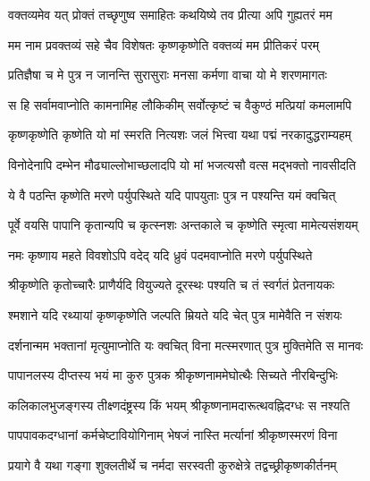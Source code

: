 

\addtocounter{shlokacount}{31}


\twolineshloka
{वक्तव्यमेव यत् प्रोक्तं तच्छृणुष्व समाहितः}
{कथयिष्ये तव प्रीत्या अपि गुह्यतरं मम} %

\twolineshloka
{मम नाम प्रवक्तव्यं सहे चैव विशेषतः}
{कृष्णकृष्णेति वक्तव्यं मम प्रीतिकरं परम्} %

\twolineshloka
{प्रतिज्ञैषा च मे पुत्र न जानन्ति सुरासुराः}
{मनसा कर्मणा वाचा यो मे शरणमागतः} %

\twolineshloka
{स हि सर्वामवाप्नोति कामनामिह लौकिकीम्}
{सर्वोत्कृष्टं च वैकुण्ठं मत्प्रियां कमलामपि} %

\twolineshloka
{कृष्णकृष्णेति कृष्णेति यो मां स्मरति नित्यशः}
{जलं भित्त्वा यथा पद्मं नरकादुद्धराम्यहम्} %

\twolineshloka
{विनोदेनापि दम्भेन मौढ्याल्लोभाच्छलादपि}
{यो मां भजत्यसौ वत्स मद्भक्तो नावसीदति} %

\twolineshloka
{ये वै पठन्ति कृष्णेति मरणे पर्युपस्थिते}
{यदि पापयुताः पुत्र न पश्यन्ति यमं क्वचित्} %

\twolineshloka
{पूर्वे वयसि पापानि कृतान्यपि च कृत्स्नशः}
{अन्तकाले च कृष्णेति स्मृत्वा मामेत्यसंशयम्} %

\twolineshloka
{नमः कृष्णाय महते विवशोऽपि वदेद् यदि}
{ध्रुवं पदमवाप्नोति मरणे पर्युपस्थिते} %

\twolineshloka
{श्रीकृष्णेति कृतोच्चारैः प्राणैर्यदि वियुज्यते}
{दूरस्थः पश्यति च तं स्वर्गतं प्रेतनायकः} %

\twolineshloka
{श्मशाने यदि रथ्यायां कृष्णकृष्णेति जल्पति}
{म्रियते यदि चेत् पुत्र मामेवैति न संशयः} %

\twolineshloka
{दर्शनान्मम भक्तानां मृत्युमाप्नोति यः क्वचित्}
{विना मत्स्मरणात् पुत्र मुक्तिमेति स मानवः} %

\twolineshloka
{पापानलस्य दीप्तस्य भयं मा कुरु पुत्रक}
{श्रीकृष्णनाममेघोत्थैः सिच्यते नीरबिन्दुभिः} %

\twolineshloka
{कलिकालभुजङ्गस्य तीक्ष्णदंष्ट्रस्य किं भयम्}
{श्रीकृष्णनामदारूत्थवह्निदग्धः स नश्यति} %

\twolineshloka
{पापपावकदग्धानां कर्मचेष्टावियोगिनाम्}
{भेषजं नास्ति मर्त्यानां श्रीकृष्णस्मरणं विना} %

\twolineshloka
{प्रयागे वै यथा गङ्गा शुक्लतीर्थे च नर्मदा}
{सरस्वती कुरुक्षेत्रे तद्वच्छ्रीकृष्णकीर्तनम्} %


